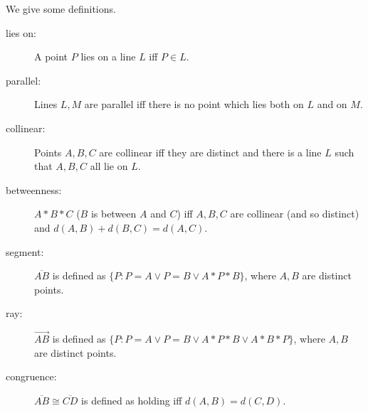 \documentclass[12pt]{article}
\begin{document}
We give some definitions.

\begin{description}

\item[lies on:]  A point $P$ lies on a line $L$ iff $P \in L$.

\item[parallel:]  Lines $L,M$ are parallel iff there is no point which lies both on $L$ and on $M$.

\item[collinear:]  Points $A,B,C$ are collinear iff they are distinct and there is a line $L$ such that $A,B,C$ all lie on $L$.

\item[betweenness:]  $A*B*C$ ($B$ is between $A$ and $C$) iff $A,B,C$ are collinear (and so distinct) and $d(A,B)+d(B,C) = d(A,C)$.

\item[segment:]  $\overline{AB}$ is defined as $\{P:P=A \vee P=B \vee A*P*B\}$, where $A,B$ are distinct points.

\item[ray:]  $\overrightarrow{AB}$ is defined as $\{P: P = A \vee P=B \vee A*P*B \vee A*B*P\}$, where $A,B$ are distinct points.

\item[congruence:]  $\overline{AB} \cong \overline{CD}$ is defined as holding iff $d(A,B)=d(C,D)$.


\end{description}
\end{document}
